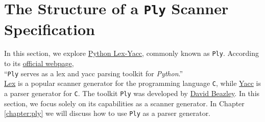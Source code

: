 \section{The Structure of a \texttt{Ply} Scanner Specification}
In this section, we explore \href{https://www.dabeaz.com/ply/}{Python Lex-Yacc},  commonly known as
\texttt{Ply}.  According to its \href{https://www.dabeaz.com/ply/}{official webpage},
\\[0.2cm]
\hspace*{1.3cm}
``\texttt{Ply} serves as a lex and yacc parsing toolkit for \textsl{Python}.''
\\[0.2cm]
\href{https://en.wikipedia.org/wiki/Lex_(software)}{Lex} is a popular scanner generator for the programming
language \texttt{C}, while \href{https://en.wikipedia.org/wiki/Yacc}{Yacc} is a parser generator for
\texttt{C}.  The toolkit \texttt{Ply} was developed by
\href{https://www.dabeaz.com/}{David Beazley}. In this section, we focus solely on its capabilities as a
scanner generator. In Chapter \ref{chapter:ply} we will discuss how to use \texttt{Ply} as a parser generator. 

